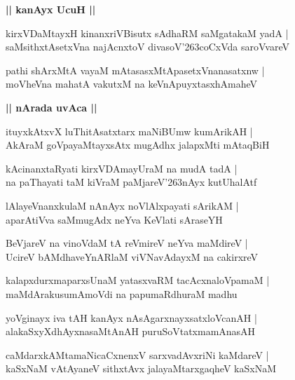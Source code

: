 \documentclass[twoside,12pt,openright]{book}
\def\S{\char'263}
\newcounter{shloka}[chapter]
\def\uvaca#1{\centerline{{\large\textbf{#1}}}}
\begin{document}
\uvaca{|| kanAyx UcuH ||}

\begin{shloka}
kirxVDaMtayxH kinanxriVBisutx sAdhaRM saMgatakaM yadA |\\
saMsithxtAsetxVna najAcnxtoV divasoV\S coCxVda saroVvareV
\end{shloka}

\begin{shloka}
pathi shArxMtA vayaM mAtasasxMtApasetxVnanasatxnw |\\
moVheVna mahatA vakutxM na keVnApuyxtasxhAmaheV 
\end{shloka}

\uvaca{|| nArada uvAca ||}

\begin{shloka}
ituyxkAtxvX luThitAsatxtarx maNiBUmw kumArikAH |\\
AkAraM goVpayaMtayxsAtx mugAdhx jalapxMti mAtaqBiH 
\end{shloka}

\begin{shloka}
kAcinanxtaRyati kirxVDAmayUraM na mudA tadA |\\
na paThayati taM kiVraM paMjareV\S nAyx kutUhalAtf 
\end{shloka}

\begin{shloka}
lAlayeVnanxkulaM nAnAyx noVlAlxpayati sArikAM |\\
aparAtiVva saMmugAdx neYva KeVlati sAraseYH
\end{shloka}

\begin{shloka}
BeVjareV na vinoVdaM tA reVmireV neYva maMdireV |\\
UcireV bAMdhaveYnARlaM viVNavAdayxM  na cakirxreV 
\end{shloka}

\begin{shloka}
kalapxdurxmaparxsUnaM yatasxvaRM tacAcxnaloVpamaM |\\
maMdArakusumAmoVdi na papumaRdhuraM madhu 
\end{shloka}

\begin{shloka}
yoVginayx iva tAH kanAyx nAsAgarxnayxsatxloVcanAH |\\
alakaSxyXdhAyxnasaMtAnAH puruSoVtatxmamAnasAH 
\end{shloka}

\begin{shloka}
caMdarxkAMtamaNicaCxnenxV sarxvadAvxriNi kaMdareV |\\
kaSxNaM vAtAyaneV sithxtAvx jalayaMtarxgaqheV kaSxNaM 
\end{shloka}
\end{document}
